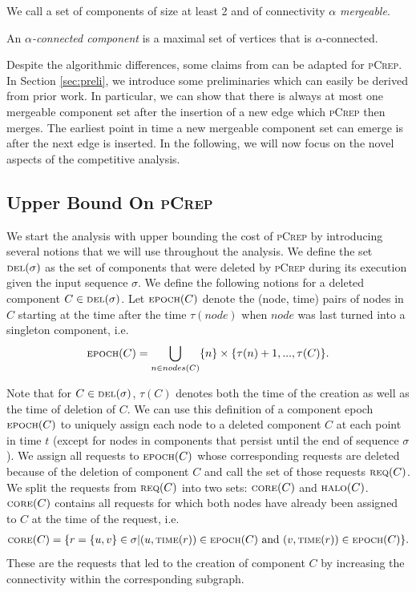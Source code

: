 \documentclass[a4paper,UKenglish,cleveref, autoref, thm-restate,authorcolumns]{lipics-v2019}
\newcommand{\adjDel}{\textsc{pCrep}}
\newcommand{\del}{\text{\scriptsize DEL}}
\newcommand{\core}{\text{\scriptsize CORE}}
\newcommand{\halo}{\text{\scriptsize HALO}}
\newcommand{\req}{\text{\scriptsize REQ}}
\newcommand{\epoch}{\text{\scriptsize EPOCH}}
\newcommand{\reqTime}{\text{\scriptsize TIME}}
\begin{document}
\begin{definition}
	We call a set of components of size at least 2 and of connectivity $\alpha$ 
	\textit{mergeable}.	
\end{definition}

\begin{definition}
	An $\alpha$\textit{-connected component} is a maximal set of vertices that is $\alpha$-connected.
\end{definition}

Despite the algorithmic differences, some claims
from \cite{Avin2015} can be adapted for \adjDel{}.
In Section \ref{sec:preli}, we introduce some preliminaries
which can easily be derived from prior work. 
In particular, we can show that there is always at most one mergeable component set after the insertion of a new edge which \adjDel{} then merges. The earliest point in time a new mergeable component set can emerge is after the next edge is inserted. 
In the following, we will now focus on the novel aspects of
the competitive analysis.

\subsection{Upper Bound On \adjDel{}}

We start the analysis with upper bounding the cost of \adjDel{} by introducing several notions that we will use throughout the analysis.
We define the set $\del(\sigma)$ as the set of components that were deleted by \adjDel{} during its execution given the input sequence $\sigma$.
We define the following notions for a deleted component $C\in\del{}(\sigma)$.
Let $\epoch{}(C)$ denote the (node, time) pairs of nodes in $C$ starting at the time after the time $\tau(node)$ when $node$ was last turned into a singleton component, i.e. 
\begin{align*}
\epoch{}(C)=\bigcup_{n\in nodes(C)}\{n\}\times\{\tau(n)+1,...,\tau(C)\}.
\end{align*}

Note that for $C\in\del(\sigma)$, $\tau(C)$ denotes both the time of the creation as well as the time of deletion of $C$. We can use this definition of a component epoch $\epoch(C)$ to uniquely assign each node to a deleted component $C$ at each point in time $t$ (except for nodes in components that persist until the end of sequence $\sigma$).
We assign all requests to $\epoch(C)$ whose corresponding requests are deleted because of the deletion of component $C$ and call the set of those requests $\req(C)$.
We split the requests from $\req{}(C)$ into two sets: $\core(C)$ and $\halo(C)$. $\core(C)$ contains all requests for which both nodes have already been assigned to $C$ at the time of the request, i.e. 
\begin{align*}
\core(C)=\{r=\{u,v\}\in\sigma| (u,\reqTime(r))\in \epoch(C)\text{ and } (v, \reqTime(r))\in \epoch(C)\}.
\end{align*}
These are the requests that led to the creation of component $C$ by increasing the connectivity within the corresponding subgraph.
\end{document}
